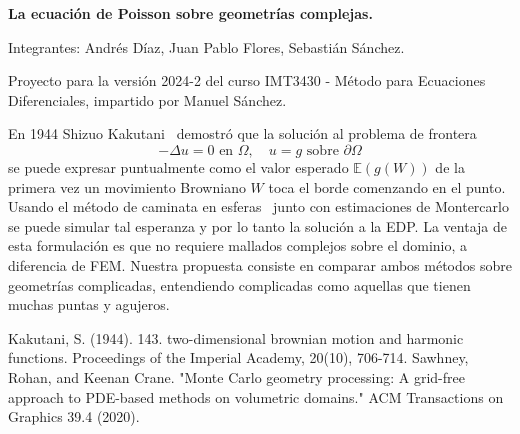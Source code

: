 \documentclass{article}
\begin{document}
\begin{center}
{\bfseries\Large
  La ecuación de Poisson sobre geometrías complejas.
}

\vspace{0.25cm}

Integrantes: Andrés Díaz, Juan Pablo Flores, Sebastián Sánchez.

\vspace{0.5cm}

{\scriptsize
Proyecto para la versión 2024-2 del curso 
IMT3430 - Método para Ecuaciones Diferenciales, impartido por Manuel Sánchez.
}
\end{center}

En 1944 Shizuo Kakutani~\cite{kak44} demostró que la solución al problema de frontera
\begin{displaymath}
  -\Delta u = 0 \text{ en } \Omega, \quad
  u = g \text{ sobre } \partial\Omega
\end{displaymath}
se puede expresar puntualmente como el valor esperado \(\mathbb{E}(g(W))\)
de la primera vez un movimiento Browniano \(W\) toca el borde comenzando en el punto.
Usando el método de caminata en esferas~\cite{sawhney2020} junto con estimaciones de 
Montercarlo se puede simular tal esperanza y por lo tanto la solución a la EDP.
La ventaja de esta formulación es que no requiere mallados complejos sobre el
dominio, a diferencia de FEM. Nuestra propuesta consiste en comparar ambos métodos
sobre geometrías complicadas, entendiendo complicadas como aquellas que tienen
muchas puntas y agujeros.


\begin{thebibliography}{9}
Kakutani, S. (1944). 143. two-dimensional brownian motion and harmonic functions. Proceedings of the Imperial Academy, 20(10), 706-714.
Sawhney, Rohan, and Keenan Crane. "Monte Carlo geometry processing: A grid-free approach to PDE-based methods on volumetric domains." ACM Transactions on Graphics 39.4 (2020).
\end{thebibliography}
\end{document}

